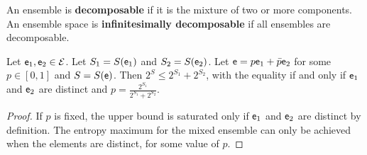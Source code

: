 \begin{defn}
	An ensemble is \textbf{decomposable} if it is the mixture of two or more components. An ensemble space is \textbf{infinitesimally decomposable} if all ensembles are decomposable.
\end{defn}


\begin{prop}
	Let $\mathsf{e}_1, \mathsf{e}_2 \in \mathcal{E}$. Let $S_1 = S(\mathsf{e}_1)$ and $S_2 = S(\mathsf{e}_2)$. Let $\mathsf{e} = p \mathsf{e}_1 + \bar{p} \mathsf{e}_2$ for some $p \in [0,1]$ and $S = S(\mathsf{e})$. Then $2^S \leq 2^{S_1} + 2^{S_2}$, with the equality if and only if $\mathsf{e}_1$ and $\mathsf{e}_2$ are distinct and $p = \frac{2^{S_1}}{2^{S_1} + 2^{S_2}}$.
\end{prop}

\begin{proof}
	If $p$ is fixed, the upper bound is saturated only if $\mathsf{e}_1$ and $\mathsf{e}_2$ are distinct by definition. The entropy maximum for the mixed ensemble can only be achieved when the elements are distinct, for some value of $p$.
	

\end{proof}
